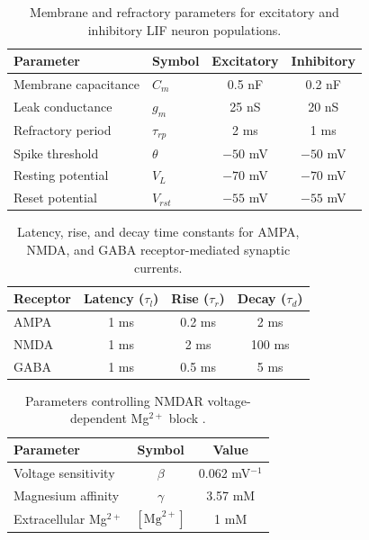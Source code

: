 \documentclass[10pt]{article}
\begin{document}
\begin{table}[htbp]
\centering
\caption{Membrane and refractory parameters for excitatory and inhibitory LIF neuron populations.}
\label{tab:neuron_params}
\begin{tabular}{llcc}
\toprule
Parameter & Symbol & Excitatory & Inhibitory \\
\midrule
Membrane capacitance & $C_m$ & 0.5 nF & 0.2 nF \\
Leak conductance & $g_m$ & 25 nS & 20 nS \\
Refractory period & $\tau_{rp}$ & 2 ms & 1 ms \\
Spike threshold & $\theta$ & $-50$ mV & $-50$ mV \\
Resting potential & $V_L$ & $-70$ mV & $-70$ mV \\
Reset potential & $V_{rst}$ & $-55$ mV & $-55$ mV \\
\bottomrule
\end{tabular}
\end{table}

\begin{table}[htbp]
\centering
\caption{Latency, rise, and decay time constants for AMPA, NMDA, and GABA receptor-mediated synaptic currents.}
\label{tab:synaptic}
\begin{tabular}{lccc}
\toprule
Receptor & Latency ($\tau_l$) & Rise ($\tau_r$) & Decay ($\tau_d$) \\
\midrule
AMPA & 1 ms & 0.2 ms & 2 ms \\
NMDA & 1 ms & 2 ms & 100 ms \\
GABA & 1 ms & 0.5 ms & 5 ms \\
\bottomrule
\end{tabular}
\end{table}

\begin{table}[htbp]
\centering
\caption{Parameters controlling NMDAR voltage-dependent Mg$^{2+}$ block \citep{jahr1990voltage}.}
\label{tab:nmdar}
\begin{tabular}{lcc}
\toprule
Parameter & Symbol & Value \\
\midrule
Voltage sensitivity & $\beta$ & 0.062 mV$^{-1}$ \\
Magnesium affinity & $\gamma$ & 3.57 mM \\
Extracellular Mg$^{2+}$ & $[\mathrm{Mg}^{2+}]$ & 1 mM \\
\bottomrule
\end{tabular}
\end{table}

\end{document}
